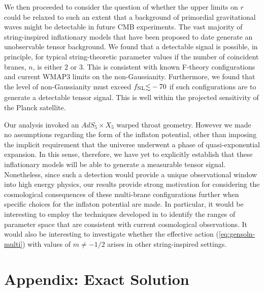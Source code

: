 {We then proceeded to consider the question of whether the upper limits on 
$r$ could be relaxed to such an extent 
that a background of primordial gravitational waves 
might be detectable in future CMB experiments. The vast majority of 
string-inspired inflationary models that have been proposed to date 
generate an unobservable tensor background. We 
found that a detectable signal is possible, in principle, 
for typical string-theoretic parameter values 
if the number of coincident branes, $n$, is either $2$ or $3$. 
This is consistent with known F-theory configurations and 
current WMAP3 limits on the non-Gaussianity. Furthermore, 
we found that the level of non-Gaussianity must exceed $\fnl 
\lsim -70$ if such configurations are to generate a detectable tensor 
signal. This is well within the projected sensitivity 
of the Planck satellite.   


Our analysis invoked an $AdS_5 \times X_5$ warped throat geometry. However we 
made no assumptions regarding the form of the inflaton potential, other 
than imposing the implicit requirement that the universe underwent a phase of 
quasi-exponential expansion. In this sense, therefore, we have 
yet to explicitly establish that these inflationary models will 
be able to generate a measurable tensor signal. 
Nonetheless, since such a detection would provide a unique observational 
window into high energy physics, our results 
provide strong motivation for considering the cosmological consequences 
of these multi-brane configurations further when specific choices for the 
inflaton potential are made. In particular, it would be interesting 
to employ the techniques developed in
\cite{bean,Peiris:2007gz,Lorenz:2007ze,Bean:2007eh,Bean:2008ga} 
to identify the ranges of parameter space that are consistent 
with current cosmological observations. It would also be interesting to 
investigate whether the effective action (\ref{eq:gensoln-multi}) with values of 
$m \ne - 1/2$ arises in other string-inspired settings. 



\section*{Appendix: Exact Solution}
\label{sec:apx-multi}

}
